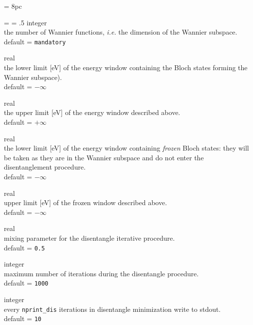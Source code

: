 \newdimen\descindent \descindent = 8pc
{\noindent \leftskip = \descindent \parskip = .5\baselineskip
{}%
{\sc integer} \\ the number of Wannier functions, {\it i.e.} the dimension of the
Wannier subspace.
\\ {\sc default} = {\tt mandatory} \par

\noindent{}%
{\sc real} \\ the lower limit [eV] of the energy window containing the Bloch states
forming the Wannier subspace).\\
{\sc default} = {\tt $-\infty$} \par

\noindent{}%
{\sc real} \\ the upper limit [eV] of the energy window described above.\\
{\sc default} = {\tt $+\infty$} \par

\noindent{}%
{\sc real} \\ the lower limit [eV] of the energy window containing {\it frozen}
Bloch states: they will be taken as they are in the Wannier subspace and do not enter
the disentanglement procedure. \\
{\sc default} = {\tt $-\infty$} \par

\noindent{}%
{\sc real} \\ upper limit [eV] of the frozen window described above.\\
{\sc default} = {\tt $-\infty$} \par

\noindent{}%
{\sc real} \\ mixing parameter for the disentangle iterative procedure.\\
{\sc default} = {\tt 0.5} \par

\noindent{}%
{\sc integer} \\  maximum number of iterations during the disentangle procedure.\\
{\sc default} = {\tt 1000} \par

\noindent{}%
{\sc integer} \\  every {\tt nprint\_dis} iterations in disentangle minimization write to
stdout.\\ {\sc default} = {\tt 10} \par

}
